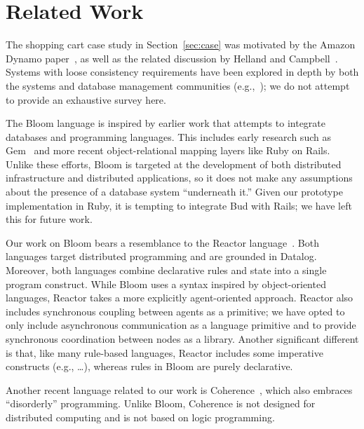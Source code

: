 \section{Related Work}
\label{sec:relwork}
The shopping cart case study in Section~\ref{sec:case} was motivated by the
Amazon Dynamo paper~\cite{dynamo}, as well as the related discussion by Helland
and Campbell~\cite{quicksand}. Systems with loose consistency requirements have
been explored in depth by both the systems and database management communities
(e.g.,~\cite{sagas,leases,dangers,bayou}); we do not attempt to provide
an exhaustive survey here.

The Bloom language is inspired by earlier work that attempts to integrate
databases and programming languages.  This includes early research such as
Gem~\cite{gem} and more recent object-relational mapping layers like Ruby on
Rails.  Unlike these efforts, Bloom is targeted at the development of both
distributed infrastructure and distributed applications, so it does not make any
assumptions about the presence of a database system ``underneath it.''  Given
our prototype implementation in Ruby, it is tempting to integrate Bud with
Rails; we have left this for future work.

Our work on Bloom bears a resemblance to the Reactor
language~\cite{reactors}. Both languages target distributed programming and are
grounded in Datalog. Moreover, both languages combine declarative rules and
state into a single program construct. While Bloom uses a syntax inspired by
object-oriented languages, Reactor takes a more explicitly agent-oriented
approach. Reactor also includes synchronous coupling between agents as a
primitive; we have opted to only include asynchronous communication as a
language primitive and to provide synchronous coordination between nodes as a
library. Another significant different is that, like many rule-based languages,
Reactor includes some imperative constructs (e.g., \ldots), whereas rules in
Bloom are purely declarative.

Another recent language related to our work is Coherence~\cite{coherence}, which
also embraces ``disorderly'' programming. Unlike Bloom, Coherence is not
designed for distributed computing and is not based on logic programming.

